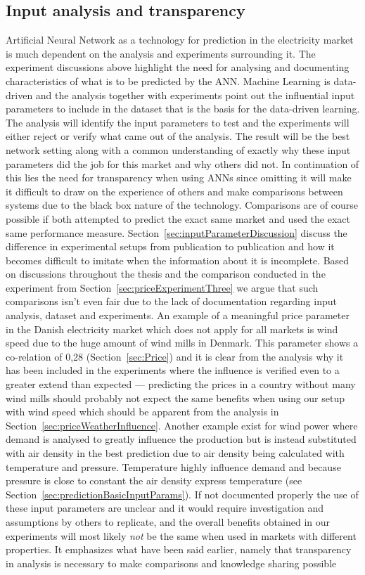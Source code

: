 \subsection{Input analysis and transparency}
Artificial Neural Network as a technology for prediction in the electricity market is much dependent on the analysis and experiments surrounding it. The experiment discussions above highlight the need for analysing and documenting characteristics of what is to be predicted by the ANN. Machine Learning is data-driven\cite{18} and the analysis together with experiments point out the influential input parameters to include in the dataset that is the basis for the data-driven learning. The analysis will identify the input parameters to test and the experiments will either reject or verify what came out of the analysis. The result will be the best network setting along with a common understanding of exactly why these input parameters did the job for this market and why others did not. In continuation of this lies the need for transparency when using ANNs since omitting it will make it difficult to draw on the experience of others and make comparisons between systems due to the black box nature of the technology. Comparisons are of course possible if both attempted to predict the exact same market and used the exact same performance measure. Section~\ref{sec:inputParameterDiscussion} discuss the difference in experimental setups from publication to publication and how it becomes difficult to imitate when the information about it is incomplete. Based on discussions throughout the thesis and the comparison conducted in the experiment from Section~\ref{sec:priceExperimentThree} we argue that such comparisons isn't even fair due to the lack of documentation regarding input analysis, dataset and experiments. An example of a meaningful price parameter in the Danish electricity market which does not apply for all markets is wind speed due to the huge amount of wind mills in Denmark. This parameter shows a co-relation of 0,28 (Section~\ref{sec:Price}) and it is clear from the analysis why it has been included in the experiments where the influence is verified even to a greater extend than expected --- predicting the prices in a country without many wind mills should probably not expect the same benefits when using our setup with wind speed which should be apparent from the analysis in Section~\ref{sec:priceWeatherInfluence}. Another example exist for wind power where demand is analysed to greatly influence the production but is instead substituted with air density in the best prediction due to air density being calculated with temperature and pressure. Temperature highly influence demand and because pressure is close to constant the air density express temperature (see Section~\ref{sec:predictionBasicInputParams}). If not documented properly the use of these input parameters are unclear and it would require investigation and assumptions by others to replicate, and the overall benefits obtained in our experiments will most likely \emph{not} be the same when used in markets with different properties. It emphasizes what have been said earlier, namely that transparency in analysis is necessary to make comparisons and knowledge sharing possible 